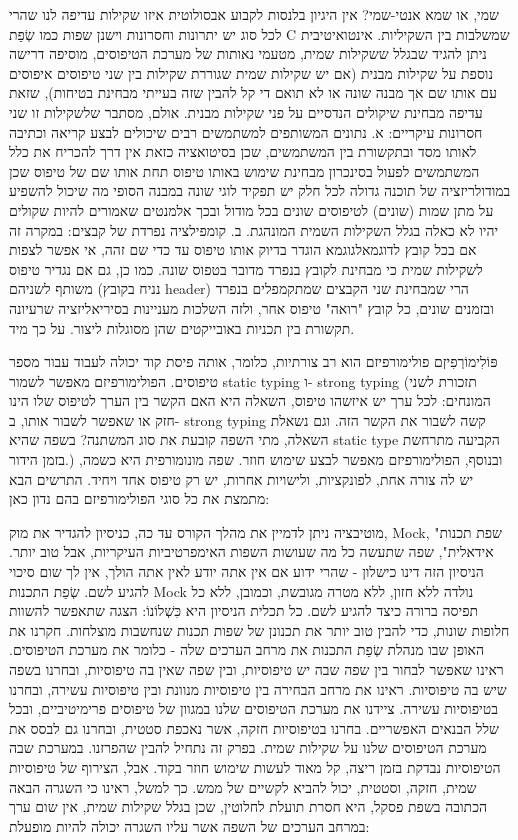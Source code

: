       שמי, או שמא אנטי-שמי?
      אין היגיון בלנסות לקבוע אבסולוטית איזו שקילות עדיפה לנו שהרי לכל סוג יש יתרונות וחסרונות וישנן שפות כמו שְׂפַת C שמשלבות בין השקיליות. אינטואיטיבית ניתן להגיד שבגלל ששקילות שמית, מטעמי נאותות של מערכת הטיפוסים, מוסיפה דרישה נוספת על שקילות מבנית (אם יש שקילות שמית שגוררת שקילות בין שני טיפוסים איפוסים עם אותו שם אך מבנה שונה או לא תואם די קל להבין שזה בעייתי מבחינת בטיחות), שזאת עדיפה מבחינת שיקולים הנדסיים על פני שקילות מבנית. אולם, מסתבר שלשקילות זו שני חסרונות עיקריים:
      א. נתונים המשותפים למשתמשים רבים שיכולים לבצע קריאה וכתיבה לאותו מסד ובתקשורת בין המשתמשים, שכן בסיטואציה כזאת אין דרך להכריח את כלל המשתמשים לפעול בסינכרון מבחינת שימוש באותו טיפוס תחת אותו שם של טיפוס שכן במודולריזציה של תוכנה גדולה לכל חלק יש תפקיד לוגי שונה במבנה הסופי מה שיכול להשפיע על מתן שמות (שונים) לטיפוסים שונים בכל מודול ובכך אלמנטים שאמורים להיות שקולים יהיו לא כאלה בגלל השקילות השמית המונהגת.
      ב. קומפילציה נפרדת של קבצים: במקרה זה אם בכל קובץ לדוגמאלגוגמא הוגדר בדיוק אותו טיפוס עד כדי שם זהה, אי אפשר לצפות לשקילות שמית כי מבחינת לקובץ בנפרד מדובר בטפוס שונה. כמו כן, גם אם נגדיר טיפוס משותף לשניהם (נניח בקובץ header) הרי שמבחינת שני הקבצים שמתקמפלים בנפרד ובזמנים שונים, כל קובץ "רואה" טיפוס אחר, ולזה השלכות מעניינות בסיריאליזציה שרעיונה תקשורת בין תכניות באובייקטים שהן מסוגלות ליצור. על כך מיד.

      פּוֹלִימוֹרְפִיזְם
      פולימורפיזם הוא רב צורתיות, כלומר, אותה פיסת קוד יכולה לעבוד עבור מספר טיפוסים. הפולימורפיזם מאפשר לשמור static typing ו- strong typing (תזכורת לשני המונחים: לכל ערך יש איזשהו טיפוס, השאלה היא האם הקשר בין הערך לטיפוס שלו הינו חזק או שאפשר לשבור אותו, ב- strong typing קשה לשבור את הקשר הזה. וגם נשאלת השאלה, מתי השפה קובעת את סוג המשתנה? בשפה שהיא static type הקביעה מתרחשת בזמן הידור.) ובנוסף, הפולימורפיזם מאפשר לבצע שימוש חוזר. שפה מונומורפית היא כשמה, יש לה צורה אחת, לפונקציות, ולישויות אחרות, יש רק טיפוס אחד ויחיד.
      התרשים הבא מתמצת את כל סוגי הפולימורפיזם בהם נדון כאן:

      מוטיבציה
      ניתן לדמיין את מהלך הקורס עד כה, כניסיון להגדיר את מוק, Mock, "שפת תכנות אידאלית", שפה שתעשה כל מה שעושות השפות האימפרטיביות העיקריות, אבל טוב יותר. הניסיון הזה דינו כישלון - שהרי ידוע אם אין אתה יודע לאין אתה הולך, אין לך שום סיכוי להגיע לשם. שְׂפַת התכנות Mock נולדה ללא חזון, ללא מטרה מגובשת, וכמובן, ללא כל תפיסה ברורה כיצד להגיע לשם. כל תכלית הניסיון היא כִּשְׁלוֹנוֹ: הצגה שתאפשר להשוות חלופות שונות, כדי להבין טוב יותר את תכנונן של שפות תכנות שנחשבות מוצלחות.
      חקרנו את האופן שבו מנהלת שְׂפַת התכנות את מרחב הערכים שלה - כלומר את מערכת הטיפוסים. ראינו שאפשר לבחור בין שפה שבה יש טיפוסיות, ובין שפה שאין בה טיפוסיות, ובחרנו בשפה שיש בה טיפוסיות. ראינו את מרחב הבחירה בין טיפוסיות מנוונת ובין טיפוסיות עשירה, ובחרנו בטיפוסיות עשירה. ציידנו את מערכת הטיפוסים שלנו במגוון של טיפוסים פרימיטיביים, ובכל שלל הבנאים האפשריים. בחרנו בטיפוסיות חזקה, אשר נאכפת סטטית, ובחרנו גם לבסס את מערכת הטיפוסים שלנו על שקילות שמית.
      בפרק זה נתחיל להבין שהפרזנו. במערכת שבה הטיפוסיות נבדקת בזמן ריצה, קל מאוד לעשות שימוש חוזר בקוד. אבל, הצירוף של טיפוסיות שמית, חזקה, וסטטית, יכול להביא לקשיים של ממש. כך למשל, ראינו כי השגרה הבאה הכתובה בשפת פסקל, היא חסרת תועלת לחלוטין, שכן בגלל שקילות שמית, אין שום ערך במרחב הערכים של השפה אשר עליו השגרה יכולה להיות מופעלת:

